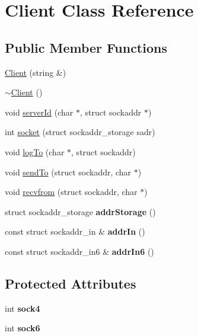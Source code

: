 \hypertarget{classClient}{\section{Client Class Reference}
\label{classClient}
}
\subsection*{Public Member Functions}
\begin{DoxyCompactItemize}
\item 
\hyperlink{classClient_a049caef7b1480331cb1cd64a77207316}{Client} (string \&)
\item 
\hyperlink{classClient_a840e519ca781888cbd54181572ebe3a7}{$\sim$\-Client} ()
\item 
void \hyperlink{classClient_a019766dfe120af45e1dc804cf546b1e5}{server\-Id} (char $\ast$, struct sockaddr $\ast$)
\item 
int \hyperlink{classClient_af3d4ff045060d8ada956932c6537a46e}{socket} (struct sockaddr\-\_\-storage sadr)
\item 
void \hyperlink{classClient_adfce451d5b4f79bae5eeedfedf577109}{log\-To} (char $\ast$, struct sockaddr)
\item 
void \hyperlink{classClient_a87552e4eb862504ec0f22f9ea0237cef}{send\-To} (struct sockaddr, char $\ast$)
\item 
void \hyperlink{classClient_a0ab2eb457fa61ac2bbff99fbc728dec2}{recvfrom} (struct sockaddr, char $\ast$)
\item 
\hypertarget{classClient_ad58aa0b3fe3da9b09e220514e00e3661}{struct sockaddr\-\_\-storage {\bfseries addr\-Storage} ()}\label{classClient_ad58aa0b3fe3da9b09e220514e00e3661}

\item 
\hypertarget{classClient_a58673099e41e465177a529fc1598e6c8}{const struct sockaddr\-\_\-in \& {\bfseries addr\-In} ()}\label{classClient_a58673099e41e465177a529fc1598e6c8}

\item 
\hypertarget{classClient_aaa05ab91ae245cd268f1a3cab2035326}{const struct sockaddr\-\_\-in6 \& {\bfseries addr\-In6} ()}\label{classClient_aaa05ab91ae245cd268f1a3cab2035326}

\end{DoxyCompactItemize}
\subsection*{Protected Attributes}
\begin{DoxyCompactItemize}
\item 
\hypertarget{classClient_a0689b78667aeebeea20c8d9069561d64}{int {\bfseries sock4}}\label{classClient_a0689b78667aeebeea20c8d9069561d64}

\item 
\hypertarget{classClient_a16332660360747503b515bd7358c91d6}{int {\bfseries sock6}}\label{classClient_a16332660360747503b515bd7358c91d6}

\end{DoxyCompactItemize}


